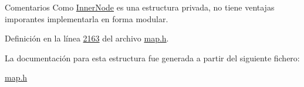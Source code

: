 \begin{DoxyRemark}{Comentarios}
Como \hyperlink{structaed2_1_1map_1_1InnerNode}{Inner\+Node} es una estructura privada, no tiene ventajas imporantes implementarla en forma modular. 
\end{DoxyRemark}


Definición en la línea \hyperlink{map_8h_source_l02163}{2163} del archivo \hyperlink{map_8h_source}{map.\+h}.



La documentación para esta estructura fue generada a partir del siguiente fichero\+:\begin{DoxyCompactItemize}
\item 
\hyperlink{map_8h}{map.\+h}\end{DoxyCompactItemize}
